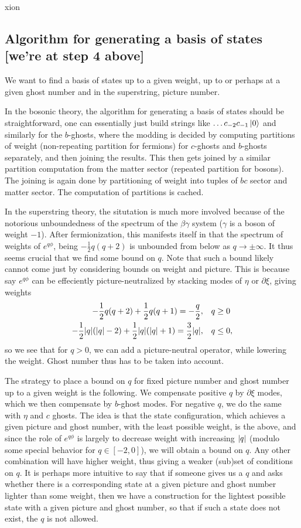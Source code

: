 xion\documentclass[12pt]{article}
\def\be{\begin{equation}}
\def\ee{\end{equation}}
\numberwithin{equation}{section}
\begin{document}
\subsection{Algorithm for generating a basis of states [we're at step 4 above]}
We want to find a basis of states up to a given weight, up to or perhaps at a given ghost number and in the superstring, picture number.


In the bosonic theory, the algorithm for generating a basis of states should be straightforward, one can essentially just build strings like $\ldots c_{-2} c_{-1} \ket{0}$ and similarly for the $b$-ghosts, where the modding is decided by computing partitions of weight (non-repeating partition for fermions) for $c$-ghosts and $b$-ghosts separately, and then joining the results. This then gets joined by a similar partition computation from the matter sector (repeated partition for bosons). The joining is again done by partitioning of weight into tuples of $bc$ sector and matter sector. The computation of partitions is cached.

In the superstring theory, the situtation is much more involved because of the notorious unboundedness of the spectrum of the $\beta \gamma$ system ($\gamma$ is a boson of weight $-1$). After fermionization, this manifests itself in that the spectrum of weights of $e^{q \phi}$, being $-\frac{1}{2} q(q+2)$ is unbounded from below as $q \to \pm \infty$. It thus seems crucial that we find some bound on $q$. Note that such a bound likely cannot come just by considering bounds on weight and picture. This is because say $e^{q\phi}$ can be effeciently picture-neutralized by stacking modes of $\eta$ or $\partial \xi$, giving weights
\be
\begin{aligned}
	-\frac{1}{2} q(q+2) + \frac{1}{2} q(q+1) = -\frac{q}{2}, \quad &q \geq 0 \\
	-\frac{1}{2} \abs{q}(\abs{q} - 2) + \frac{1}{2} \abs{q}(\abs{q} + 1) = \frac{3}{2} \abs{q}, \quad &q \leq 0,
\end{aligned}
\ee
so we see that for $q > 0$, we can add a picture-neutral operator, while lowering the weight. Ghost number thus has to be taken into account.

The strategy to place a bound on $q$ for fixed picture number and ghost number up to a given weight is the following. We compensate positive $q$ by $\partial \xi$ modes, which we then compensate by $b$-ghost modes. For negative $q$, we do the same with $\eta$ and $c$ ghosts. The idea is that the state configuration, which achieves a given picture and ghost number, with the least possible weight, is the above, and since the role of $e^{q\phi}$ is largely to decrease weight with increasing $\abs{q}$ (modulo some special behavior for $q \in [-2,0]$), we will obtain a bound on $q$. Any other combination will have higher weight, thus giving a weaker (sub)set of conditions on $q$. It is perhaps more intuitive to say that if someone gives us a $q$ and asks whether there is a corresponding state at a given picture and ghost number lighter than some weight, then we have a construction for the lightest possible state with a given picture and ghost number, so that if such a state does not exist, the $q$ is not allowed.
\end{document}

